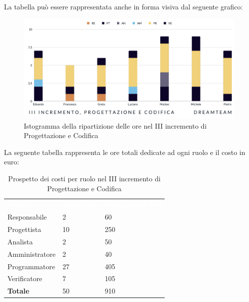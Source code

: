 La tabella può essere rappresentata anche in forma visiva dal seguente grafico:
\begin{figure}[H]
\centering
\includegraphics[scale=0.50]{Sezioni/SezioniPreventivo/grafici/progettazione/Progettazione_III_incremento.png}
\caption{Istogramma della ripartizione delle ore nel III incremento di Progettazione e Codifica}
\end{figure}

La seguente tabella rappresenta le ore totali dedicate ad ogni ruolo e il costo in euro:

\begin{table}[H]
\begin{center}
\renewcommand{\arraystretch}{1.5}
\begin{tabular}{ m{}<{\centering}  m{}<{\centering} m{}<{\centering}}
	\rowcolor{darkblue}
	\textcolor{white}{\textbf{Ruolo}}&\textcolor{white}{\textbf{Totale ore}}&\textcolor{white}{\textbf{Costo totale (\euro)}}\\ 

	Responsabile  & 2 & 60 \\	
	
	Progettista & 10 & 250 \\
	
	Analista & 2 & 50 \\

	Amministratore & 2 & 40 \\
	
	Programmatore & 27 & 405 \\
	
	Verificatore & 7 & 105 \\
	
	\textbf{Totale} & 50 & 910 \\
	
\end{tabular}
\caption{Prospetto dei costi per ruolo nel III incremento di Progettazione e Codifica}
\end{center}
\end{table}


